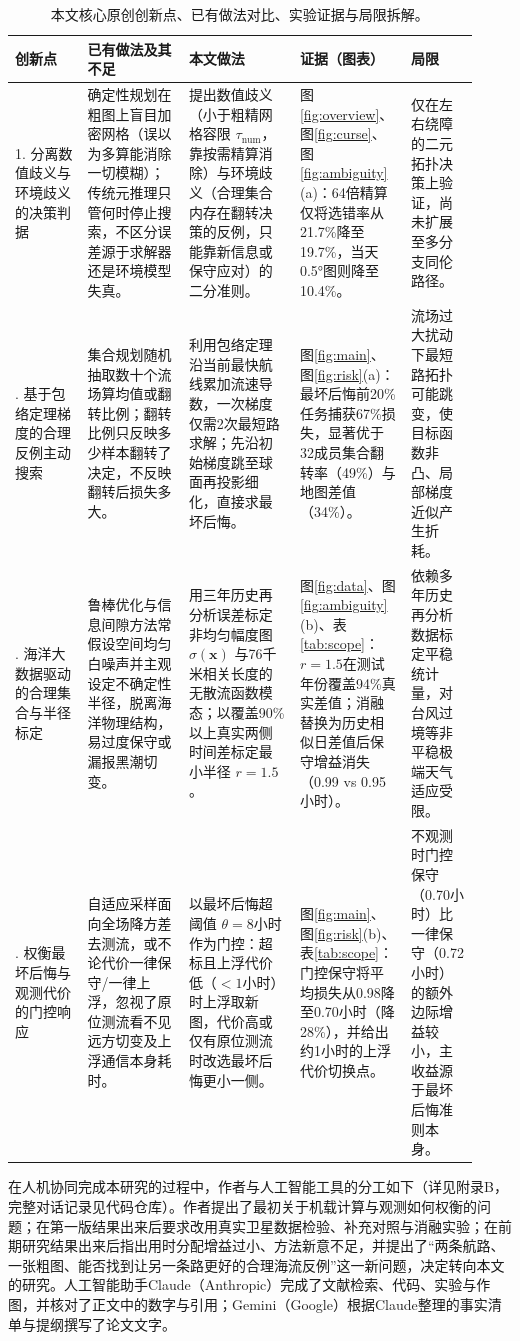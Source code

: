 \begin{table}[htbp]
\centering
\caption{本文核心原创创新点、已有做法对比、实验证据与局限拆解。}
\label{tab:innovation}
\small
\begin{tabular}{@{}p{0.15\linewidth}p{0.21\linewidth}p{0.23\linewidth}p{0.19\linewidth}p{0.14\linewidth}@{}}
\toprule
创新点 & 已有做法及其不足 & 本文做法 & 证据（图表） & 局限 \\
\midrule
1. 分离数值歧义与环境歧义的决策判据 & 确定性规划在粗图上盲目加密网格（误以为多算能消除一切模糊）；传统元推理只管何时停止搜索，不区分误差源于求解器还是环境模型失真。 & 提出数值歧义（小于粗精网格容限 $\tau_{\text{num}}$，靠按需精算消除）与环境歧义（合理集合内存在翻转决策的反例，只能靠新信息或保守应对）的二分准则。 & 图\ref{fig:overview}、图\ref{fig:curse}、图\ref{fig:ambiguity}(a)：64倍精算仅将选错率从21.7\%降至19.7\%，当天0.5°图则降至10.4\%。 & 仅在左右绕障的二元拓扑决策上验证，尚未扩展至多分支同伦路径。 \\
\addlinespace
2. 基于包络定理梯度的合理反例主动搜索 & 集合规划随机抽取数十个流场算均值或翻转比例；翻转比例只反映多少样本翻转了决定，不反映翻转后损失多大。 & 利用包络定理沿当前最快航线累加流速导数，一次梯度仅需2次最短路求解；先沿初始梯度跳至球面再投影细化，直接求最坏后悔。 & 图\ref{fig:main}、图\ref{fig:risk}(a)：最坏后悔前20\%任务捕获67\%损失，显著优于32成员集合翻转率（49\%）与地图差值（34\%）。 & 流场过大扰动下最短路拓扑可能跳变，使目标函数非凸、局部梯度近似产生折耗。 \\
\addlinespace
3. 海洋大数据驱动的合理集合与半径标定 & 鲁棒优化与信息间隙方法常假设空间均匀白噪声并主观设定不确定性半径，脱离海洋物理结构，易过度保守或漏报黑潮切变。 & 用三年历史再分析误差标定非均匀幅度图 $\sigma(\boldsymbol{x})$ 与76千米相关长度的无散流函数模态；以覆盖90\%以上真实两侧时间差标定最小半径 $r=1.5$。 & 图\ref{fig:data}、图\ref{fig:ambiguity}(b)、表\ref{tab:scope}：$r=1.5$在测试年份覆盖94\%真实差值；消融替换为历史相似日差值后保守增益消失（0.99 vs 0.95小时）。 & 依赖多年历史再分析数据标定平稳统计量，对台风过境等非平稳极端天气适应受限。 \\
\addlinespace
4. 权衡最坏后悔与观测代价的门控响应 & 自适应采样面向全场降方差去测流，或不论代价一律保守/一律上浮，忽视了原位测流看不见远方切变及上浮通信本身耗时。 & 以最坏后悔超阈值 $\theta=8$小时作为门控：超标且上浮代价低（$<1$小时）时上浮取新图，代价高或仅有原位测流时改选最坏后悔更小一侧。 & 图\ref{fig:main}、图\ref{fig:risk}(b)、表\ref{tab:scope}：门控保守将平均损失从0.98降至0.70小时（降28\%），并给出约1小时的上浮代价切换点。 & 不观测时门控保守（0.70小时）比一律保守（0.72小时）的额外边际增益较小，主收益源于最坏后悔准则本身。 \\
\bottomrule
\end{tabular}
\end{table}

在人机协同完成本研究的过程中，作者与人工智能工具的分工如下（详见附录B，完整对话记录见代码仓库）。作者提出了最初关于机载计算与观测如何权衡的问题；在第一版结果出来后要求改用真实卫星数据检验、补充对照与消融实验；在前期研究结果出来后指出用时分配增益过小、方法新意不足，并提出了“两条航路、一张粗图、能否找到让另一条路更好的合理海流反例”这一新问题，决定转向本文的研究。人工智能助手Claude（Anthropic）完成了文献检索、代码、实验与作图，并核对了正文中的数字与引用；Gemini（Google）根据Claude整理的事实清单与提纲撰写了论文文字。
